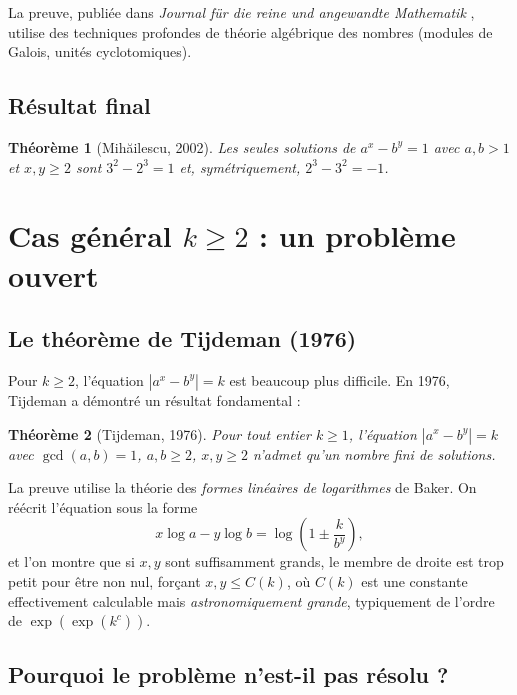 \documentclass[12pt,a4paper]{article}
\theoremstyle{plain}
\newtheorem{theorem}{Théorème}[section]
\theoremstyle{definition}
\begin{document}
La preuve, publiée dans \emph{Journal für die reine und angewandte Mathematik} \cite{Mihailescu}, utilise des techniques profondes de théorie algébrique des nombres (modules de Galois, unités cyclotomiques).

\subsection{Résultat final}
\begin{theorem}[Mihăilescu, 2002]
Les seules solutions de $a^x - b^y = 1$ avec $a,b>1$ et $x,y\ge 2$ sont $3^2 - 2^3 = 1$ et, symétriquement, $2^3 - 3^2 = -1$.
\end{theorem}

\section{Cas général \texorpdfstring{$k \ge 2$}{k≥2} : un problème ouvert}
\label{sec:kgeneral}

\subsection{Le théorème de Tijdeman (1976)}

Pour $k \ge 2$, l'équation $|a^x - b^y| = k$ est beaucoup plus difficile. En 1976, Tijdeman \cite{Tijdeman1976} a démontré un résultat fondamental :

\begin{theorem}[Tijdeman, 1976]
Pour tout entier $k \ge 1$, l'équation $|a^x - b^y| = k$ avec $\gcd(a,b)=1$, $a,b \ge 2$, $x,y \ge 2$ n'admet qu'un nombre fini de solutions.
\end{theorem}

La preuve utilise la théorie des \emph{formes linéaires de logarithmes} de Baker. On réécrit l'équation sous la forme
\[
x \log a - y \log b = \log\!\left(1 \pm \frac{k}{b^y}\right),
\]
et l'on montre que si $x,y$ sont suffisamment grands, le membre de droite est trop petit pour être non nul, forçant $x,y \le C(k)$, où $C(k)$ est une constante effectivement calculable mais \emph{astronomiquement grande}, typiquement de l'ordre de $\exp(\exp(k^c))$. 

\subsection{Pourquoi le problème n'est-il pas résolu ?}
\end{document}
